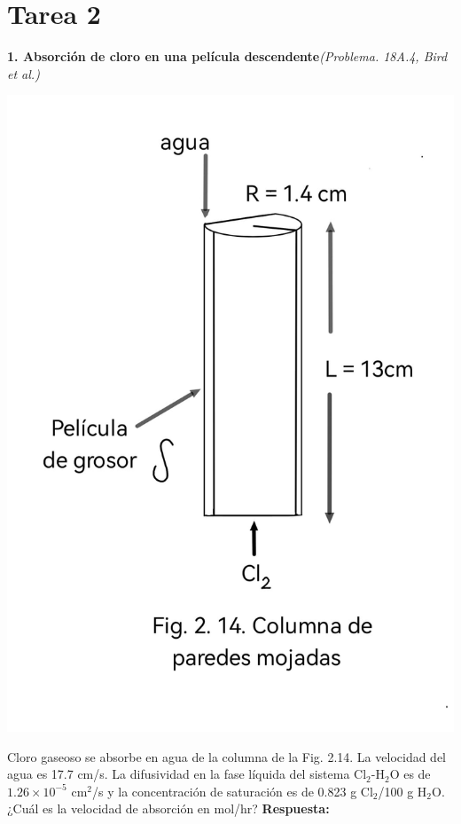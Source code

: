 \newpage
\section*{Tarea 2}

\textbf{1. Absorción de cloro en una película descendente}\textit{(Problema. 18A.4, Bird et al.)}
\flushleft
\begin{minipage}{0.3\textwidth} %
    \includegraphics[width=\linewidth]{./Capitulo2/Imagenes/imagen-1.jpg} %
\end{minipage}
\hfill %
\begin{minipage}{0.65\textwidth} %
Cloro gaseoso se absorbe en agua de la columna de la Fig. 2.14. La velocidad del agua es 17.7 cm/s. La difusividad en la fase líquida del sistema Cl$_2$-H$_2$O es de $1.26 \times 10^{-5}$ cm$^2$/s y la concentración de saturación es de 0.823 g Cl$_2$/100 g H$_2$O. ¿Cuál es la velocidad de absorción en mol/hr?
\vspace{0.5cm} %
\flushleft
\textbf{Respuesta:}  
\end{minipage}
\vspace{0.5cm} 

